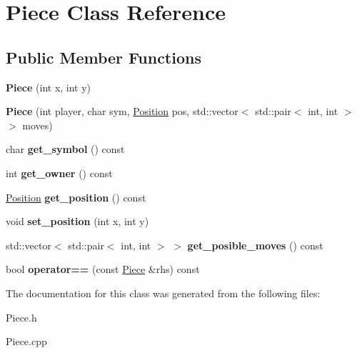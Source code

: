 \hypertarget{class_piece}{}\section{Piece Class Reference}
\label{class_piece}
\subsection*{Public Member Functions}
\begin{DoxyCompactItemize}
\item 
\mbox{\label{class_piece_af1d9eb7f67a06fd1dec6c990c95b5801}} 
{\bfseries Piece} (int x, int y)
\item 
\mbox{\label{class_piece_a14670dac899c8c3ea9efe5e11a87fd85}} 
{\bfseries Piece} (int player, char sym, \hyperlink{struct_position}{Position} pos, std\+::vector$<$ std\+::pair$<$ int, int $>$$>$ moves)
\item 
\mbox{\label{class_piece_ad0eb90d1f75a909240d98ed70d72e4f4}} 
char {\bfseries get\+\_\+symbol} () const
\item 
\mbox{\label{class_piece_ab588439a98647b6b6deef620be16e7ae}} 
int {\bfseries get\+\_\+owner} () const
\item 
\mbox{\label{class_piece_a6dcc7df628eb1f8317caaa4970835517}} 
\hyperlink{struct_position}{Position} {\bfseries get\+\_\+position} () const
\item 
\mbox{\label{class_piece_a20bfbba13742685ede3fbde882f9cbf5}} 
void {\bfseries set\+\_\+position} (int x, int y)
\item 
\mbox{\label{class_piece_a328672e36bcdd76b0ea1892e3a733bda}} 
std\+::vector$<$ std\+::pair$<$ int, int $>$ $>$ {\bfseries get\+\_\+posible\+\_\+moves} () const
\item 
\mbox{\label{class_piece_a874649d960a257b6fa24baa3319fb5e8}} 
bool {\bfseries operator==} (const \hyperlink{class_piece}{Piece} \&rhs) const
\end{DoxyCompactItemize}


The documentation for this class was generated from the following files\+:\begin{DoxyCompactItemize}
\item 
Piece.\+h\item 
Piece.\+cpp\end{DoxyCompactItemize}
